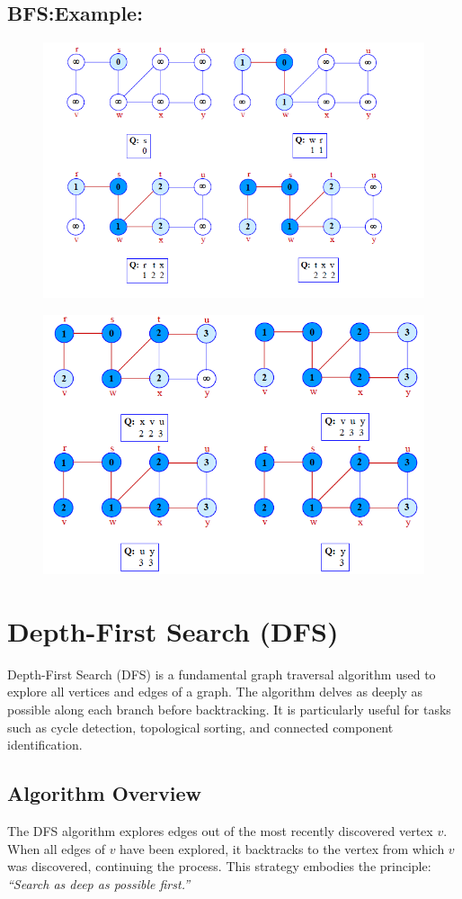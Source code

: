 \subsection{BFS:Example:}
\begin{figure}[h!]
    \centering
\includegraphics[width=0.75\linewidth]{BFS Ex. 1.png}
\end{figure}
\begin{figure} [h!]
    \centering
\includegraphics[width=0.75\linewidth]{BFS EX. 2.png}
\end{figure}
\newpage
\section{Depth-First Search (DFS)}

Depth-First Search (DFS) is a fundamental graph traversal algorithm used to explore all vertices and edges of a graph. The algorithm delves as deeply as possible along each branch before backtracking. It is particularly useful for tasks such as cycle detection, topological sorting, and connected component identification.

\subsection{Algorithm Overview}
The DFS algorithm explores edges out of the most recently discovered vertex \(v\). When all edges of \(v\) have been explored, it backtracks to the vertex from which \(v\) was discovered, continuing the process. This strategy embodies the principle: \emph{``Search as deep as possible first.''}

